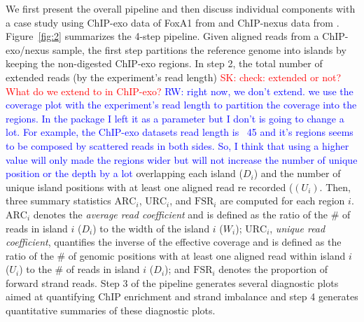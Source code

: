 \documentclass{bmcart}
\newcommand{\SK}[1]{\textcolor{red}{SK: #1}}
\newcommand{\RW}[1]{\textcolor{blue}{RW: #1}}
\begin{document}
We first present the overall pipeline and then discuss individual
components with a case study using ChIP-exo data of FoxA1 from
\cite{exoillumina} and ChIP-nexus data from \cite{chipnexus}.
Figure~\ref{fig:2} summarizes the 4-step pipeline.  Given
aligned reads from a ChIP-exo/nexus sample, the first step partitions
the reference genome into islands by keeping the non-digested ChIP-exo
regions.  In step 2, the total number of extended reads (by the
experiment's read length) \SK{check: extended or not? What do we
  extend to in ChIP-exo?} \RW{right now, we don't extend. we use the
  coverage plot with the experiment's read length to partition the
  coverage into the regions. In the package I left it as a parameter
  but I don't is going to change a lot. For example, the ChIP-exo
  datasets read length is ~45 and it's regions seems to be composed by
  scattered reads in both sides. So, I think that using a higher value
  will only made the regions wider but will not increase the number of
  unique position or the depth by a lot} overlapping each island
($D_i$) and the number of unique island positions with at least one
aligned read re recorded ($(U_i)$. Then, three summary statistics
$\text{ARC}_i$, $\text{URC}_i$, and $\text{FSR}_i$ are computed for
each region $i$.  $\text{ARC}_i$ denotes the \textit{average read
  coefficient} and is defined as the ratio of the \# of reads in
island $i$ ($D_i$) to the width of the island $i$ ($W_i$);
$\text{URC}_i$, \textit{unique read coefficient}, quantifies the
inverse of the effective coverage and is defined as the ratio of the
\# of genomic positions with at least one aligned read within island
$i$ ($U_i$) to the \# of reads in island $i$ ($D_i$); and
$\text{FSR}_i$ denotes the proportion of forward strand reads.
Step 3 of the pipeline generates several diagnostic plots aimed at
quantifying ChIP enrichment and strand imbalance and step 4 generates
quantitative summaries of these diagnostic plots.
\end{document}
